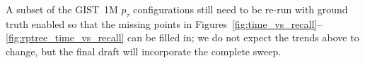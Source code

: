 A subset of the GIST~1M $p_\tau$ configurations still need to be re-run with ground truth enabled so that the missing points in Figures~\ref{fig:time_vs_recall}--\ref{fig:rptree_time_vs_recall} can be filled in; we do not expect the trends above to change, but the final draft will incorporate the complete sweep.
